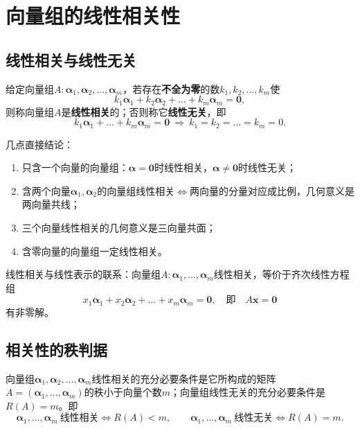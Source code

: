 
\section{向量组的线性相关性}

\subsection{线性相关与线性无关}
\begin{definition}
给定向量组$A:\boldsymbol{\alpha}_1,\boldsymbol{\alpha}_2,\dots,\boldsymbol{\alpha}_m$，若存在\textbf{不全为零}的数$k_1,k_2,\dots,k_m$使
\[
k_1\boldsymbol{\alpha}_1+k_2\boldsymbol{\alpha}_2+\dots+k_m\boldsymbol{\alpha}_m=\boldsymbol{0},
\]
则称向量组$A$是\textbf{线性相关}的；否则称它\textbf{线性无关}，即
\[
k_1\boldsymbol{\alpha}_1+\dots+k_m\boldsymbol{\alpha}_m=\boldsymbol{0}
\ \Longrightarrow\ k_1=k_2=\dots=k_m=0.
\]
\end{definition}

几点直接结论：
\begin{enumerate}
    \item 只含一个向量的向量组：$\boldsymbol{\alpha}=\boldsymbol{0}$时线性相关，$\boldsymbol{\alpha}\ne\boldsymbol{0}$时线性无关；
    \item 含两个向量$\boldsymbol{\alpha}_1,\boldsymbol{\alpha}_2$的向量组线性相关$\iff$两向量的分量对应成比例，几何意义是两向量共线；
    \item 三个向量线性相关的几何意义是三向量共面；
    \item 含零向量的向量组一定线性相关。
\end{enumerate}

线性相关与线性表示的联系：向量组$A:\boldsymbol{\alpha}_1,\dots,\boldsymbol{\alpha}_m$线性相关，等价于齐次线性方程组
\[
x_1\boldsymbol{\alpha}_1+x_2\boldsymbol{\alpha}_2+\dots+x_m\boldsymbol{\alpha}_m=\boldsymbol{0},
\quad\text{即}\quad A\boldsymbol{x}=\boldsymbol{0}
\]
有非零解。

\subsection{相关性的秩判据}
\begin{theorem}[线性相关性的秩判据]
向量组$\boldsymbol{\alpha}_1,\boldsymbol{\alpha}_2,\dots,\boldsymbol{\alpha}_m$线性相关的充分必要条件是它所构成的矩阵$A=(\boldsymbol{\alpha}_1,\dots,\boldsymbol{\alpha}_m)$的秩小于向量个数$m$；向量组线性无关的充分必要条件是$R(A)=m$。即
\[
\boldsymbol{\alpha}_1,\dots,\boldsymbol{\alpha}_m\ \text{线性相关}\iff R(A)<m,
\qquad
\boldsymbol{\alpha}_1,\dots,\boldsymbol{\alpha}_m\ \text{线性无关}\iff R(A)=m.
\]
\end{theorem}

